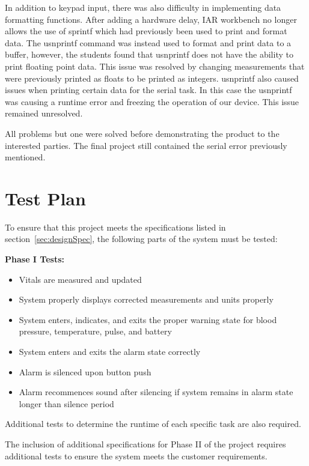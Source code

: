 \documentclass[12pt]{article} %
\begin{document}
    In addition to keypad input, there was also difficulty in implementing data
    formatting functions. After adding a hardware delay, IAR workbench no
    longer allows the use of sprintf which had previously been used to print
    and format data. The usnprintf command was instead used to format and print
    data to a buffer, however, the students found that usnprintf does not have
    the ability to print floating point data. This issue was resolved by
    changing measurements that were previously printed as floats to be printed
    as integers. usnprintf also caused issues when printing certain data for
    the serial task. In this case the usnprintf was causing a runtime error and
    freezing the operation of our device. This issue remained unresolved. 
    
    
    
    
    All problems but one were solved before demonstrating the product to the interested
    parties. The final project still contained the serial error previously mentioned.
    
    \section{Test Plan} 

    To ensure that this project meets the specifications listed in 
    section~\ref{sec:designSpec}, the following parts of the system must be 
    tested: 

		\textbf{Phase I Tests:}
    \begin{itemize}
      \item Vitals are measured and updated
      \item System properly displays corrected measurements and units properly
      \item System enters, indicates, and exits the proper warning state for
	blood pressure, temperature, pulse, and battery
      \item System enters and exits the alarm state correctly
      \item Alarm is silenced upon button push
      \item Alarm recommences sound after silencing if system remains in alarm
	state longer than silence period
    \end{itemize}

    Additional tests to determine the runtime of each specific task are also
    required.

    The inclusion of additional specifications for Phase II of the project
    requires additional tests to ensure the system meets the customer
    requirements.
\end{document}
